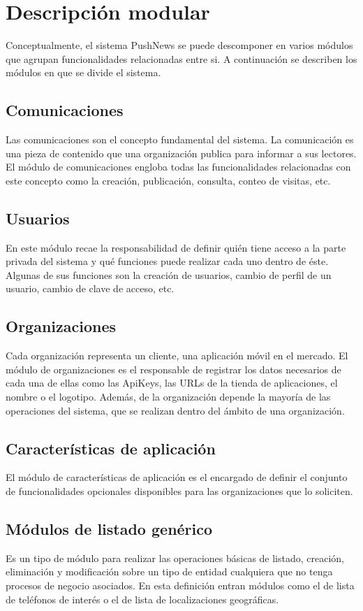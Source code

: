 \section{Descripción modular}
Conceptualmente, el sistema PushNews se puede descomponer en varios módulos que agrupan funcionalidades relacionadas entre si. A continuación se describen los módulos en que se divide el sistema.

\subsection{Comunicaciones}
Las comunicaciones son el concepto fundamental del sistema. La comunicación es una pieza de contenido que una organización publica para informar a sus lectores. El módulo de comunicaciones engloba todas las funcionalidades relacionadas con este concepto como la creación, publicación, consulta, conteo de visitas, etc.

\subsection{Usuarios}
En este módulo recae la responsabilidad de definir quién tiene acceso a la parte privada del sistema y qué funciones puede realizar cada uno dentro de éste. Algunas de sus funciones son la creación de usuarios, cambio de perfil de un usuario, cambio de clave de acceso, etc.

\subsection{Organizaciones}
Cada organización representa un cliente, una aplicación móvil en el mercado. El módulo de organizaciones es el responsable de registrar los datos necesarios de cada una de ellas como las ApiKeys, las URLs de la tienda de aplicaciones, el nombre o el logotipo. Además, de la organización depende la mayoría de las operaciones del sistema, que se realizan dentro del ámbito de una organización.

\subsection{Características de aplicación}
El módulo de características de aplicación es el encargado de definir el conjunto de funcionalidades opcionales disponibles para las organizaciones que lo soliciten.

\subsection{Módulos de listado genérico}
Es un tipo de módulo para realizar las operaciones básicas de listado, creación, eliminación y modificación sobre un tipo de entidad cualquiera que no tenga procesos de negocio asociados. En esta definición entran módulos como el de lista de teléfonos de interés o el de lista de localizaciones geográficas.

